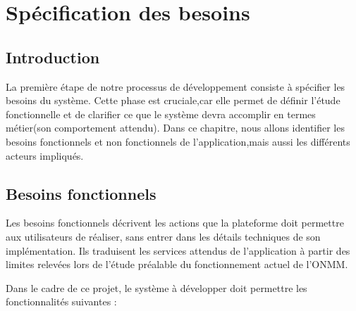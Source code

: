 ﻿\documentclass[12pt,a4paper]{report}
\begin{document}
\chapter{Sp\'ecification des besoins}

\section{Introduction}

La première étape de notre processus de développement consiste à spécifier les besoins
du système. Cette phase est cruciale,car elle permet de définir l’étude fonctionnelle et de
clarifier ce que le système devra accomplir en termes métier(son comportement attendu).
Dans ce chapitre, nous allons identifier les besoins fonctionnels et non fonctionnels de
l’application,mais aussi les différents acteurs impliqués.
\section{Besoins fonctionnels}

Les besoins fonctionnels décrivent les actions que la plateforme doit
permettre aux utilisateurs de réaliser, sans entrer dans les détails
techniques de son implémentation. Ils traduisent les services attendus
de l’application à partir des limites relevées lors de l’étude préalable
du fonctionnement actuel de l’ONMM.

Dans le cadre de ce projet, le système à développer doit permettre les
fonctionnalités suivantes :
\end{document}

